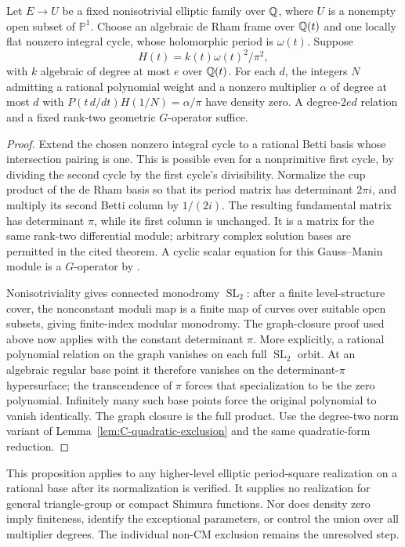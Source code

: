\begin{proposition}\label{prop:C-general-elliptic-density}
Let $E\to U$ be a fixed nonisotrivial elliptic family over $\mathbb Q$, where
$U$ is a nonempty open subset of $\mathbb P^1$. Choose an algebraic
de Rham frame over $\mathbb Q(t)$ and one locally flat nonzero integral
cycle, whose holomorphic period is $\omega(t)$. Suppose
\[
 H(t)=k(t)\omega(t)^2/\pi^2,
\]
with $k$ algebraic of degree at most $e$ over $\mathbb Q(t)$.
For each $d$, the integers $N$ admitting a rational polynomial weight
and a nonzero multiplier $\alpha$ of degree at most $d$ with
$P(t\,d/dt)H(1/N)=\alpha/\pi$ have density zero. A degree-$2ed$
relation and a fixed rank-two geometric $G$-operator suffice.
\end{proposition}
\begin{proof}
Extend the chosen nonzero integral cycle to a rational Betti basis whose intersection pairing is one. This is possible even for a nonprimitive first cycle, by dividing the second cycle by the first cycle's divisibility. Normalize the cup product of the de Rham basis so that its period
matrix has determinant $2\pi i$, and multiply its second Betti column
by $1/(2i)$. The resulting fundamental matrix has determinant $\pi$,
while its first column is unchanged. It is a matrix for the same
rank-two differential module; arbitrary complex solution bases are
permitted in the cited theorem. A cyclic scalar equation for this
Gauss--Manin module is a $G$-operator by
\cite[Theorem~3.10]{BaldiBinyaminiUrbanik2026}.

Nonisotriviality gives connected monodromy $\operatorname{SL}_2$:
after a finite level-structure cover, the nonconstant moduli map is
a finite map of curves over suitable open subsets, giving
finite-index modular monodromy. The graph-closure proof used above
now applies with the constant determinant $\pi$. More explicitly,
a rational polynomial relation on the graph vanishes on each full
$\operatorname{SL}_2$ orbit. At an algebraic regular base point it
therefore vanishes on the determinant-$\pi$ hypersurface; the
transcendence of $\pi$ forces that specialization to be the zero
polynomial. Infinitely many such base points force the original
polynomial to vanish identically. The graph closure is the full
product. Use the degree-two norm variant of
Lemma~\ref{lem:C-quadratic-exclusion} and the same quadratic-form
reduction.
\end{proof}

This proposition applies to any higher-level elliptic period-square
realization on a rational base after its normalization is verified.
It supplies no realization for general triangle-group or compact
Shimura functions. Nor does density zero imply finiteness, identify
the exceptional parameters, or control the union over all multiplier
degrees. The individual non-CM exclusion remains the unresolved step.




